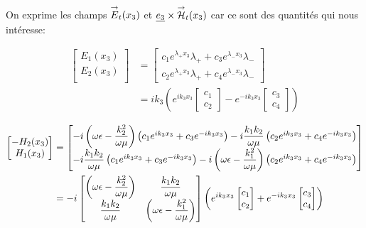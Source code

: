     On exprime les champs ${\overset{\rightarrow}{E}}_t(x_3)$ et $\underline{e_3} \times {\overset{\rightarrow}{\mathcal{H}}}_t(x_3)$ car ce sont des quantités qui nous intéresse:

    \begin{align}
        \begin{bmatrix}
            E_1(x_3)\\
            E_2(x_3)\\
        \end{bmatrix}
        &=
        \begin{bmatrix}
            c_1 e^{\lambda_+ x_3} \lambda_{+} + c_3 e^{\lambda_- x_3} \lambda_{-} \\
            c_2 e^{\lambda_+ x_3} \lambda_{+} + c_4 e^{\lambda_- x_3} \lambda_{-}
        \end{bmatrix}\\
        &=ik_3\left( e^{ik_3 x_3}
        \begin{bmatrix}
            c_1 \\
            c_2
        \end{bmatrix}
        -e^{-ik_3 x_3}
        \begin{bmatrix}
            c_3 \\
            c_4
        \end{bmatrix}
        \right)
        \label{eq:imp_fourier:plan:generale_E}
    \end{align}

    \begin{align}
        \begin{bmatrix}
            -H_2(x_3)\\
            H_1(x_3)\\
        \end{bmatrix}
        &=
        \begin{bmatrix}
            -i\left(\omega\epsilon - \dfrac{k_2^2}{\omega\mu}\right) \left( c_1 e^{ik_3 x_3} + c_3 e^{-ik_3 x_3} \right) - i\dfrac{k_1k_2}{\omega\mu} \left( c_2 e^{ik_3 x_3} + c_4 e^{-ik_3 x_3} \right)
            \\
            -i\dfrac{k_1k_2}{\omega\mu} \left( c_1 e^{ik_3 x_3} + c_3 e^{-ik_3 x_3} \right) - i\left(\omega\epsilon - \dfrac{k_1^2}{\omega\mu}\right)\left( c_2 e^{ik_3 x_3} + c_4 e^{-ik_3 x_3} \right)
        \end{bmatrix} \\
        &=-i
        \begin{bmatrix}
        \left(\omega\epsilon - \dfrac{k_2^2}{\omega\mu}\right) & \dfrac{k_1k_2}{\omega\mu}
        \\
        \dfrac{k_1k_2}{\omega\mu} & \left(\omega\epsilon - \dfrac{k_1^2}{\omega\mu}\right) 
        \end{bmatrix}
        \left(
            e^{ik_3 x_3}
            \begin{bmatrix}
                c_1 \\
                c_2
            \end{bmatrix}
            +e^{-ik_3 x_3}
            \begin{bmatrix}
                c_3 \\
                c_4
            \end{bmatrix}
        \right)
        \label{eq:imp_fourier:plan:generale_H}
    \end{align}

